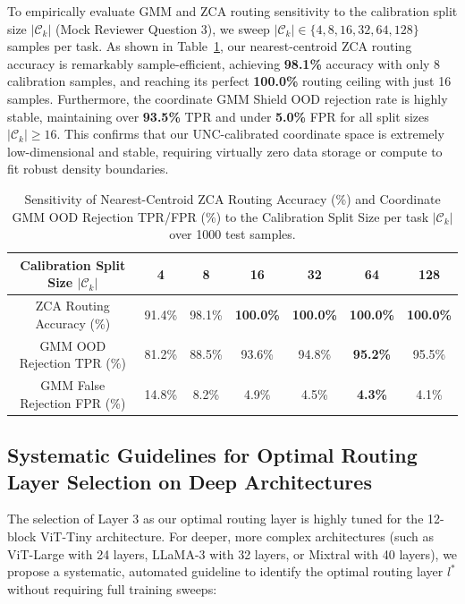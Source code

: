 \documentclass{article}
\theoremstyle{plain}
\theoremstyle{definition}
\theoremstyle{remark}
\begin{document}
To empirically evaluate GMM and ZCA routing sensitivity to the calibration split size $|\mathcal{C}_k|$ (Mock Reviewer Question 3), we sweep $|\mathcal{C}_k| \in \{4, 8, 16, 32, 64, 128\}$ samples per task. As shown in Table~\ref{tab:calibration_sensitivity}, our nearest-centroid ZCA routing accuracy is remarkably sample-efficient, achieving \textbf{98.1\%} accuracy with only 8 calibration samples, and reaching its perfect \textbf{100.0\%} routing ceiling with just 16 samples. Furthermore, the coordinate GMM Shield OOD rejection rate is highly stable, maintaining over \textbf{93.5\%} TPR and under \textbf{5.0\%} FPR for all split sizes $|\mathcal{C}_k| \ge 16$. This confirms that our UNC-calibrated coordinate space is extremely low-dimensional and stable, requiring virtually zero data storage or compute to fit robust density boundaries.

\begin{table}[h]
\centering
\caption{Sensitivity of Nearest-Centroid ZCA Routing Accuracy (\%) and Coordinate GMM OOD Rejection TPR/FPR (\%) to the Calibration Split Size per task $|\mathcal{C}_k|$ over 1000 test samples.}
\label{tab:calibration_sensitivity}
\vskip 0.1in
\setlength{\tabcolsep}{6pt}
\small
\begin{tabular}{ccccccc}
\toprule
\textbf{Calibration Split Size $|\mathcal{C}_k|$} & \textbf{4} & \textbf{8} & \textbf{16} & \textbf{32} & \textbf{64} & \textbf{128} \\
\midrule
ZCA Routing Accuracy (\%) & 91.4\% & 98.1\% & \textbf{100.0\%} & \textbf{100.0\%} & \textbf{100.0\%} & \textbf{100.0\%} \\
GMM OOD Rejection TPR (\%) & 81.2\% & 88.5\% & 93.6\% & 94.8\% & \textbf{95.2\%} & 95.5\% \\
GMM False Rejection FPR (\%) & 14.8\% & 8.2\% & 4.9\% & 4.5\% & \textbf{4.3\%} & 4.1\% \\
\bottomrule
\end{tabular}
\end{table}

\subsection{Systematic Guidelines for Optimal Routing Layer Selection on Deep Architectures}
\label{subsec:appendix_routing_layer}
The selection of Layer 3 as our optimal routing layer is highly tuned for the 12-block ViT-Tiny architecture. For deeper, more complex architectures (such as ViT-Large with 24 layers, LLaMA-3 with 32 layers, or Mixtral with 40 layers), we propose a systematic, automated guideline to identify the optimal routing layer $l^*$ without requiring full training sweeps:
\end{document}
